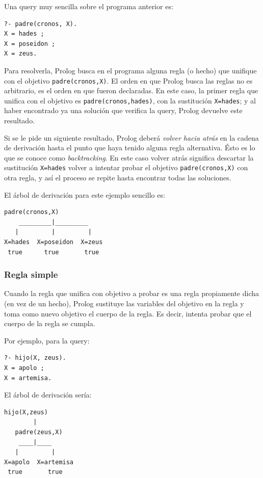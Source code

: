 \documentclass[12pt,titlepage]{article}
\begin{document}
Una query muy sencilla sobre el programa anterior es:
\begin{lstlisting}
?- padre(cronos, X).
X = hades ;
X = poseidon ;
X = zeus.
\end{lstlisting}

Para resolverla, Prolog busca en el programa alguna regla (o hecho) que unifique con el objetivo \lstinline|padre(cronos,X)|. El orden en que Prolog busca las reglas no es arbitrario, es el orden en que fueron declaradas. En este caso, la primer regla que unifica con el objetivo es \lstinline|padre(cronos,hades)|, con la sustitución \lstinline|X=hades|; y al haber encontrado ya una solución que verifica la query, Prolog devuelve este resultado. 

Si se le pide un siguiente resultado, Prolog deberá \emph{volver hacia atrás} en la cadena de derivación hasta el punto que haya tenido alguna regla alternativa. Ésto es lo que se conoce como \emph{backtracking}. En este caso volver atrás significa descartar la sustitución \lstinline|X=hades| volver a intentar probar el objetivo \lstinline|padre(cronos,X)| con otra regla, y así el proceso se repite hasta encontrar todas las soluciones.

El árbol de derivación para este ejemplo sencillo es:
\begin{Verbatim}[samepage=true]
       padre(cronos,X)
    _________|_________
   |         |         |
X=hades  X=poseidon  X=zeus
 true      true       true
\end{Verbatim}

\subsubsection{Regla simple}

Cuando la regla que unifica con objetivo a probar es una regla propiamente dicha (en vez de un hecho), Prolog sustituye las variables del objetivo en la regla y toma como nuevo objetivo el cuerpo de la regla. Es decir, intenta probar que el cuerpo de la regla se cumpla.

Por ejemplo, para la query:
\begin{lstlisting}
?- hijo(X, zeus).
X = apolo ;
X = artemisa.
\end{lstlisting}

El árbol de derivación sería:
\begin{Verbatim}[samepage=true]
   hijo(X,zeus)
        |
   padre(zeus,X)
    ____|____
   |         |
X=apolo  X=artemisa
 true       true
\end{Verbatim}
\end{document}
